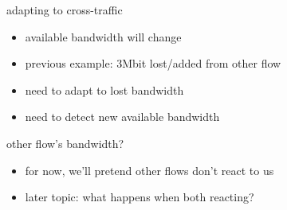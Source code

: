 \begin{frame}{adapting to cross-traffic}
    \begin{itemize}
    \item available bandwidth will change
    \item previous example: 3Mbit lost/added from other flow
    \vspace{.5cm}
    \item need to adapt to lost bandwidth
    \item need to detect new available bandwidth
    \end{itemize}
\end{frame}

\begin{frame}{other flow's bandwidth?}
    \begin{itemize}
    \item for now, we'll pretend other flows don't react to us
    \vspace{.5cm}
    \item later topic: what happens when both reacting?
    \end{itemize}
\end{frame}
